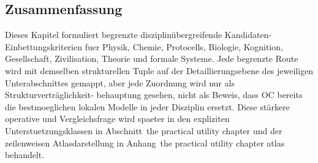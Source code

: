 \subsection*{Zusammenfassung}

Dieses Kapitel formuliert begrenzte disziplinübergreifende Kandidaten-
Einbettungskriterien fuer Physik, Chemie, Protocells, Biologie, Kognition,
Gesellschaft, Zivilisation, Theorie und formale Systeme. Jede begrenzte Route
wird mit demselben strukturellen Tuple auf der Detaillierungsebene des jeweiligen
Unterabschnittes gemappt, aber jede Zuordnung wird nur als Strukturverträglichkeit-
behauptung gesehen, nicht als Beweis, dass OC bereits die bestmoeglichen lokalen
Modelle in jeder Disziplin ersetzt. Diese stärkere operative und Vergleichsfrage
wird spaeter in den expliziten Unterstuetzungsklassen in
Abschnitt~the practical utility chapter und der zeilenweisen
Atlasdarstellung in
Anhang~the practical utility chapter atlas behandelt.

